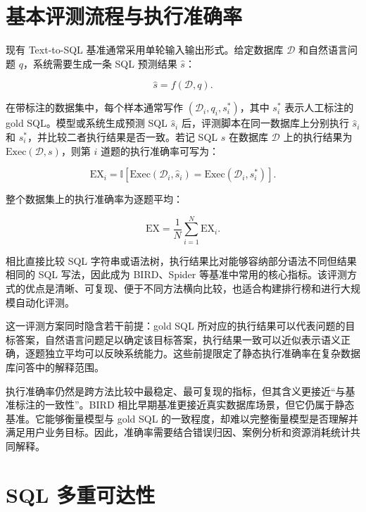 \documentclass[
    bachelor,
    pdflinks,
]{xjtuthesis}
\begin{document}
\section{基本评测流程与执行准确率}

现有 Text-to-SQL 基准通常采用单轮输入输出形式。给定数据库 $\mathcal{D}$ 和自然语言问题 $q$，系统需要生成一条 SQL 预测结果 $\hat{s}$：

\begin{equation}
\hat{s} = f(\mathcal{D}, q) .
\end{equation}

在带标注的数据集中，每个样本通常写作 $(\mathcal{D}_i, q_i, s_i^\ast)$，其中 $s_i^\ast$ 表示人工标注的 gold SQL。模型或系统生成预测 SQL $\hat{s}_i$ 后，评测脚本在同一数据库上分别执行 $\hat{s}_i$ 和 $s_i^\ast$，并比较二者执行结果是否一致。若记 SQL $s$ 在数据库 $\mathcal{D}$ 上的执行结果为 $\mathrm{Exec}(\mathcal{D},s)$，则第 $i$ 道题的执行准确率可写为：

\begin{equation}
\mathrm{EX}_i =
\mathbb{I}\left[
\mathrm{Exec}(\mathcal{D}_i,\hat{s}_i)
=
\mathrm{Exec}(\mathcal{D}_i,s_i^\ast)
\right] .
\end{equation}

整个数据集上的执行准确率为逐题平均：

\begin{equation}
\mathrm{EX} = \frac{1}{N}\sum_{i=1}^{N}\mathrm{EX}_i .
\end{equation}

相比直接比较 SQL 字符串或语法树，执行结果比对能够容纳部分语法不同但结果相同的 SQL 写法，因此成为 BIRD、Spider 等基准中常用的核心指标。该评测方式的优点是清晰、可复现、便于不同方法横向比较，也适合构建排行榜和进行大规模自动化评测。

这一评测方案同时隐含若干前提：gold SQL 所对应的执行结果可以代表问题的目标答案，自然语言问题足以确定该目标答案，执行结果一致可以近似表示语义正确，逐题独立平均可以反映系统能力。这些前提限定了静态执行准确率在复杂数据库问答中的解释范围。

执行准确率仍然是跨方法比较中最稳定、最可复现的指标，但其含义更接近“与基准标注的一致性”。BIRD 相比早期基准更接近真实数据库场景，但它仍属于静态基准。它能够衡量模型与 gold SQL 的一致程度，却难以完整衡量模型是否理解并满足用户业务目标。因此，准确率需要结合错误归因、案例分析和资源消耗统计共同解释。

\section{SQL 多重可达性}
\end{document}
